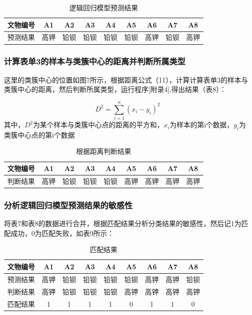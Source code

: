 \documentclass[withoutpreface,bwprint]{cumcmthesis}%
\begin{document}
	\begin{table}[!htb]
	\centering
	\caption{逻辑回归模型预测结果}
	\begin{tabular}{ccccccccc}
		\toprule[1.5pt]
		文物编号&A1&A2&A3&A4&A5&A6&A7&A8\\
		\midrule[1pt]
		预测结果&高钾&铅钡&铅钡&铅钡&铅钡&高钾&铅钡&高钾\\
		\bottomrule[1.5pt]
	\end{tabular}
	\end{table}
	
	\subsubsection{计算表单3的样本与类簇中心的距离并判断所属类型}
	这里的类簇中心的位置如图7所示，根据距离公式（11），计算计算表单3的样本与类簇中心的距离，然后判断所属类型，运行程序[附录4],得出结果（表8）：
	
	\begin{equation}
		D^{2} = \sum_{i=1}^{n}\left(x_{i}-y_{i}\right)^2
	\end{equation}
	其中，$D^{2}$为某个样本与类簇中心点的距离的平方和，$x_{i}$为样本的第i个数据，$y_{i}$为类簇中心点的第i个数据
	
	\begin{table}[!htb]
	\centering
	\caption{根据距离判断结果}
	\begin{tabular}{ccccccccc}
		\toprule[1.5pt]
		文物编号&A1&A2&A3&A4&A5&A6&A7&A8\\
		\midrule[1pt]
		判断结果&高钾&铅钡&铅钡&铅钡&高钾&高钾&高钾&高钾\\
		\bottomrule[1.5pt]
	\end{tabular}
	\end{table}
	
	\subsubsection{分析逻辑回归模型预测结果的敏感性}
	将表7和表8的数据进行合并，根据匹配结果分析分类结果的敏感性，然后记1为匹配成功，0为匹配失败，如表9所示：
	
	\begin{table}[!htb]
		\centering
		\caption{匹配结果}
		\begin{tabular}{ccccccccc}
			\toprule[1.5pt]
			文物编号&A1&A2&A3&A4&A5&A6&A7&A8\\
			\midrule[1pt]
			预测结果&高钾&铅钡&铅钡&铅钡&铅钡&高钾&高钾&铅钡\\
			\hline
			判断结果&高钾&铅钡&铅钡&铅钡&高钾&高钾&高钾&高钾\\
			\hline
			匹配结果&1&1&1&1&0&1&1&0\\
			\bottomrule[1.5pt]
		\end{tabular}
	\end{table}
	
\end{document}
